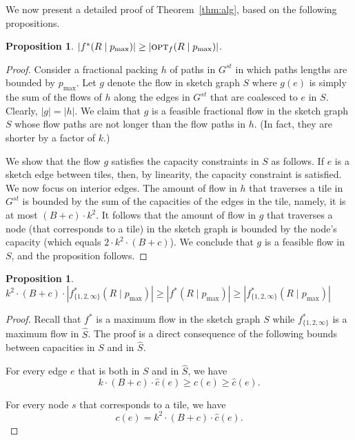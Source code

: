 \documentclass[11pt]{article}
\newtheorem{proposition}[theorem]{Proposition}
\newcommand{\opt}{\text{\textsc{opt}}}
\newcommand{\pmax}{p_{\max}}
\newenvironment{proof sketch}[1]{\noindent {\emph{Proof sketch of #1:}}}{\hfill \qed}
\begin{document}
\medskip
\noindent
We now present a detailed proof of Theorem~\ref{thm:alg}, based on the following propositions.
\begin{proposition}\label{prop:opt}
$|f^*(R\mid\pmax)| \geq |\opt_f(R\mid\pmax)|$.
\end{proposition}
\begin{proof}
  Consider a fractional packing $h$ of paths in $G^{st}$ in which
  paths lengths are bounded by $\pmax$.  Let $g$ denote the flow in
  sketch graph $S$ where $g(e)$ is simply the sum of the flows of
  $h$ along the edges in $G^{st}$ that are coalesced to $e$ in
  $S$. Clearly, $|g|=|h|$. We claim that $g$ is a feasible
  fractional flow in the sketch graph $S$ whose flow paths are not
  longer than the flow paths in $h$. (In fact, they are shorter by a factor of $k$.)

  We show that the flow $g$ satisfies the capacity constraints in $S$
  as follows. If $e$ is a sketch edge between tiles, then, by
  linearity, the capacity constraint is satisfied.  We now focus on
  interior edges.  The amount of flow in $h$ that traverses a tile in
  $G^{st}$ is bounded by the sum of the capacities of the
  edges in the tile, namely, it is at most $(B+c)\cdot k^2$. It
  follows that the amount of flow in $g$ that traverses a node (that
  corresponds to a tile) in the sketch graph is bounded by the node's
  capacity (which equals $2\cdot k^2 \cdot (B+c)$). We conclude that $g$ is a feasible flow in $S$, and the proposition follows.
\end{proof}

\begin{proposition}\label{prop:scaled}
    $k^{2}\cdot(B+c)\cdot |f^*_{\{1,2,\infty\}}(R\mid\pmax)| \geq |f^*(R\mid\pmax)| \geq |f^*_{\{1,2,\infty\}}(R\mid\pmax)|$
\end{proposition}

\begin{proof}
  Recall that $f^*$ is a maximum flow in the sketch graph $S$ while
  $f^*_{\{1,2,\infty\}}$ is a maximum flow in $\hat{S}$.
The proof is a direct consequence of the following bounds between capacities in $S$
and in $\hat S$.

  For every edge $e$ that is both in $S$ and in $\hat S$, we have
  \begin{equation}\label{eq:cap S}
    k\cdot (B+c) \cdot \hat c(e) \geq c(e) \geq \hat c(e).
  \end{equation}

 For every node $s$ that corresponds to a tile, we have
  \begin{equation}\label{eq:cap S}
  c(e)= k^2 \cdot (B+c)\cdot \hat c(e).
  \end{equation}
\end{proof}
\end{document}
